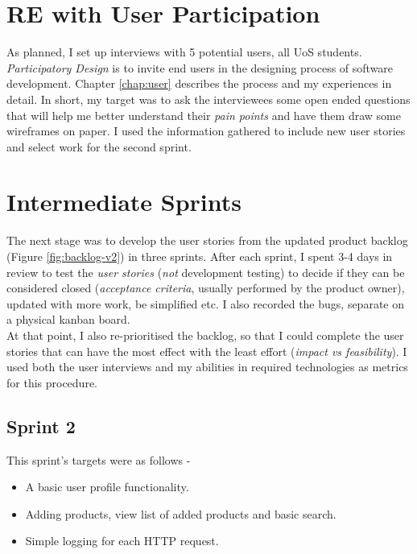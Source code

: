 \section{RE with User Participation}

As planned, I set up interviews with 5 potential users, all UoS students. \textit{Participatory Design} is to invite end users in the designing process of software development. Chapter \ref{chap:user} describes the process and my experiences in detail. In short, my target was to ask the interviewees some open ended questions that will help me better understand their \textit{pain points} and have them draw some wireframes on paper. I used the information gathered to include new user stories and select work for the second sprint.

\section{Intermediate Sprints}

The next stage was to develop the user stories from the updated product backlog (Figure \ref{fig:backlog-v2}) in three sprints. After each sprint, I spent 3-4 days in review to test the \textit{user stories} (\textit{not} development testing) to decide if they can be considered closed (\textit{acceptance criteria}, usually performed by the product owner), updated with more work, be simplified etc. I also recorded the bugs, separate on a physical kanban board.\\

At that point, I also re-prioritised the backlog, so that I could complete the user stories that can have the most effect with the least effort (\textit{impact vs feasibility}). I used both the user interviews and my abilities in required technologies as metrics for this procedure.

\subsection{Sprint 2}

This sprint's targets were as follows - 

\begin{itemize}
	\item A basic user profile functionality.
	\item Adding products, view list of added products and basic search.
	\item Simple logging for each HTTP request.
\end{itemize}

